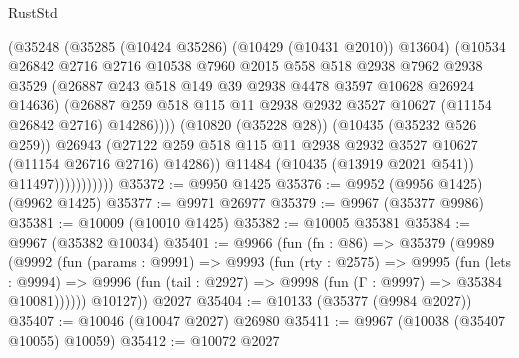 \begin{lexlean}{RustStd}
\begin{coremodule}
                              (@35248
                                (@35285 (@10424 @35286) (@10429 (@10431 @2010)) @13604)
                                (@10534
                                  @26842
                                  @2716
                                  @2716
                                  @10538
                                  @7960
                                  @2015
                                  @558
                                  @518
                                  @2938
                                  @7962
                                  @2938
                                  @3529
                                  (@26887 @243 @518 @149 @39 @2938 @4478 @3597 @10628 @26924 @14636)
                                  (@26887
                                    @259
                                    @518
                                    @115
                                    @11
                                    @2938
                                    @2932
                                    @3527
                                    @10627
                                    (@11154 @26842 @2716)
                                    @14286))))
                            (@10820 (@35228 @28))
                            (@10435 (@35232 @526 @259))
                            @26943
                            (@27122
                              @259
                              @518
                              @115
                              @11
                              @2938
                              @2932
                              @3527
                              @10627
                              (@11154 @26716 @2716)
                              @14286))
                          @11484
                          (@10435 (@13919 @2021 @541))
                          @11497)))))))))))
@35372 := @9950 @1425
@35376 := @9952 (@9956 @1425) (@9962 @1425)
@35377 := @9971 @26977
@35379 := @9967 (@35377 @9986)
@35381 := @10009 (@10010 @1425)
@35382 := @10005 @35381
@35384 := @9967 (@35382 @10034)
@35401 := @9966
    (fun (fn : @86) =>
    @35379
      (@9989
        (@9992
          (fun (params : @9991) =>
          @9993
            (fun (rty : @2575) =>
            @9995
              (fun (lets : @9994) =>
              @9996 (fun (tail : @2927) => @9998 (fun (Γ : @9997) => @35384 @10081))))))
        @10127))
    @2027
@35404 := @10133 (@35377 (@9984 @2027))
@35407 := @10046 (@10047 @2027) @26980
@35411 := @9967 (@10038 (@35407 @10055) @10059)
@35412 := @10072 @2027

\end{coremodule}
\end{lexlean}
